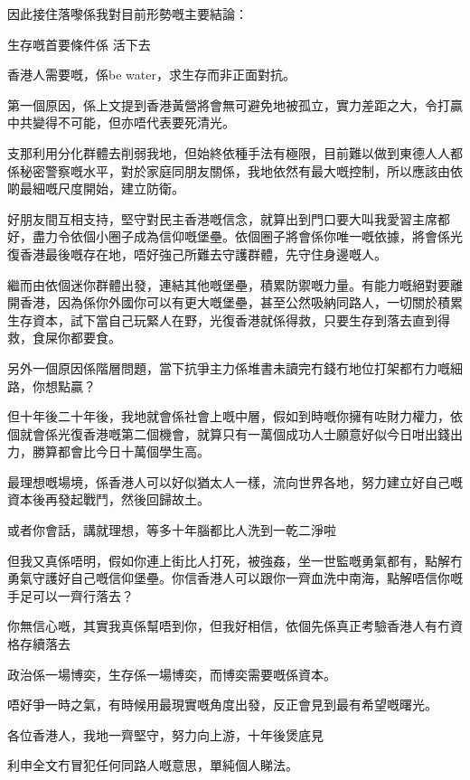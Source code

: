 因此接住落嚟係我對目前形勢嘅主要結論：

生存嘅首要條件係 活下去

香港人需要嘅，係be water，求生存而非正面對抗。

第一個原因，係上文提到香港黃營將會無可避免地被孤立，實力差距之大，令打贏中共變得不可能，但亦唔代表要死清光。

支那利用分化群體去削弱我地，但始終依種手法有極限，目前難以做到東德人人都係秘密警察嘅水平，對於家庭同朋友關係，我地依然有最大嘅控制，所以應該由依啲最細嘅尺度開始，建立防衛。

好朋友間互相支持，堅守對民主香港嘅信念，就算出到門口要大叫我愛習主席都好，盡力令依個小圈子成為信仰嘅堡壘。依個圈子將會係你唯一嘅依據，將會係光復香港最後嘅存在地，唔好強己所難去守護群體，先守住身邊嘅人。

繼而由依個迷你群體出發，連結其他嘅堡壘，積累防禦嘅力量。有能力嘅絕對要離開香港，因為係你外國你可以有更大嘅堡壘，甚至公然吸納同路人，一切關於積累生存資本，試下當自己玩緊人在野，光復香港就係得救，只要生存到落去直到得救，食屎你都要食。

另外一個原因係階層問題，當下抗爭主力係堆書未讀完冇錢冇地位打架都冇力嘅細路，你想點贏？

但十年後二十年後，我地就會係社會上嘅中層，假如到時嘅你擁有咗財力權力，依個就會係光復香港嘅第二個機會，就算只有一萬個成功人士願意好似今日咁出錢出力，勝算都會比今日十萬個學生高。

最理想嘅場境，係香港人可以好似猶太人一樣，流向世界各地，努力建立好自己嘅資本後再發起戰鬥，然後回歸故土。

或者你會話，講就理想，等多十年腦都比人洗到一乾二淨啦

但我又真係唔明，假如你連上街比人打死，被強姦，坐一世監嘅勇氣都有，點解冇勇氣守護好自己嘅信仰堡壘。你信香港人可以跟你一齊血洗中南海，點解唔信你嘅手足可以一齊行落去？

你無信心嘅，其實我真係幫唔到你，但我好相信，依個先係真正考驗香港人有冇資格存續落去

政治係一場博奕，生存係一場博奕，而博奕需要嘅係資本。

唔好爭一時之氣，有時候用最現實嘅角度出發，反正會見到最有希望嘅曙光。

各位香港人，我地一齊堅守，努力向上游，十年後煲底見

利申全文冇冒犯任何同路人嘅意思，單純個人睇法。

